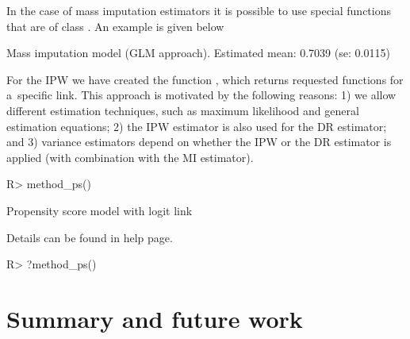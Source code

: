\documentclass[nojss]{jss}
\begin{document}
In the case of mass imputation estimators it is possible to use special
functions  that are of class .
An example is given below

\begin{CodeChunk}
\begin{CodeOutput}
Mass imputation model (GLM approach). Estimated mean: 0.7039 (se: 0.0115)
\end{CodeOutput}
\end{CodeChunk}

For the IPW we have created the function , which
returns requested functions for a~specific link. This approach is
motivated by the following reasons: 1) we allow different estimation
techniques, such as maximum likelihood and general estimation equations;
2) the IPW estimator is also used for the DR estimator; and 3) variance
estimators depend on whether the IPW or the DR estimator is applied
(with combination with the MI estimator).

\begin{CodeChunk}
\begin{CodeInput}
R> method_ps()
\end{CodeInput}
\begin{CodeOutput}
Propensity score model with logit link
\end{CodeOutput}
\end{CodeChunk}

Details can be found in help page.

\begin{CodeChunk}
\begin{CodeInput}
R> ?method_ps()
\end{CodeInput}
\end{CodeChunk}

\section{Summary and future work}\label{summary-and-future-work}
\end{document}
